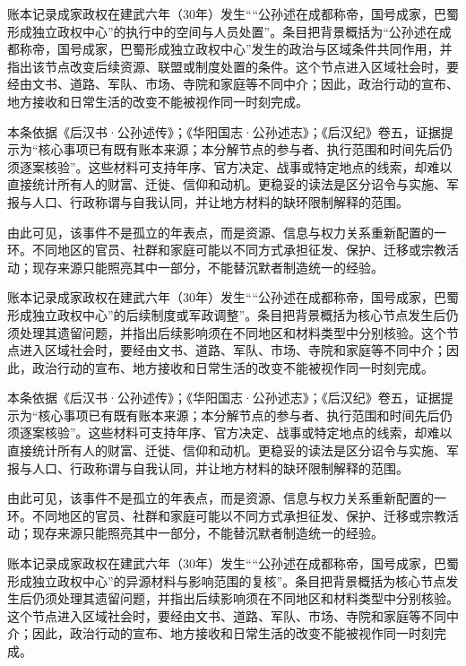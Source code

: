 账本记录成家政权在建武六年（30年）发生““公孙述在成都称帝，国号成家，巴蜀形成独立政权中心”的执行中的空间与人员处置”。条目把背景概括为“公孙述在成都称帝，国号成家，巴蜀形成独立政权中心”发生的政治与区域条件共同作用，并指出该节点改变后续资源、联盟或制度处置的条件。这个节点进入区域社会时，要经由文书、道路、军队、市场、寺院和家庭等不同中介；因此，政治行动的宣布、地方接收和日常生活的改变不能被视作同一时刻完成。

本条依据《后汉书·公孙述传》；《华阳国志·公孙述志》；《后汉纪》卷五，证据提示为“核心事项已有既有账本来源；本分解节点的参与者、执行范围和时间先后仍须逐案核验”。这些材料可支持年序、官方决定、战事或特定地点的线索，却难以直接统计所有人的财富、迁徙、信仰和动机。更稳妥的读法是区分诏令与实施、军报与人口、行政称谓与自我认同，并让地方材料的缺环限制解释的范围。

由此可见，该事件不是孤立的年表点，而是资源、信息与权力关系重新配置的一环。不同地区的官员、社群和家庭可能以不同方式承担征发、保护、迁移或宗教活动；现存来源只能照亮其中一部分，不能替沉默者制造统一的经验。

账本记录成家政权在建武六年（30年）发生““公孙述在成都称帝，国号成家，巴蜀形成独立政权中心”的后续制度或军政调整”。条目把背景概括为核心节点发生后仍须处理其遗留问题，并指出后续影响须在不同地区和材料类型中分别核验。这个节点进入区域社会时，要经由文书、道路、军队、市场、寺院和家庭等不同中介；因此，政治行动的宣布、地方接收和日常生活的改变不能被视作同一时刻完成。

本条依据《后汉书·公孙述传》；《华阳国志·公孙述志》；《后汉纪》卷五，证据提示为“核心事项已有既有账本来源；本分解节点的参与者、执行范围和时间先后仍须逐案核验”。这些材料可支持年序、官方决定、战事或特定地点的线索，却难以直接统计所有人的财富、迁徙、信仰和动机。更稳妥的读法是区分诏令与实施、军报与人口、行政称谓与自我认同，并让地方材料的缺环限制解释的范围。

由此可见，该事件不是孤立的年表点，而是资源、信息与权力关系重新配置的一环。不同地区的官员、社群和家庭可能以不同方式承担征发、保护、迁移或宗教活动；现存来源只能照亮其中一部分，不能替沉默者制造统一的经验。

账本记录成家政权在建武六年（30年）发生““公孙述在成都称帝，国号成家，巴蜀形成独立政权中心”的异源材料与影响范围的复核”。条目把背景概括为核心节点发生后仍须处理其遗留问题，并指出后续影响须在不同地区和材料类型中分别核验。这个节点进入区域社会时，要经由文书、道路、军队、市场、寺院和家庭等不同中介；因此，政治行动的宣布、地方接收和日常生活的改变不能被视作同一时刻完成。

